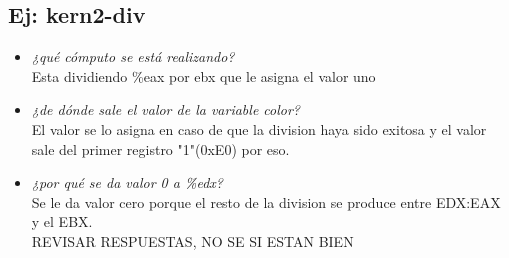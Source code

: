 \documentclass[a4paper, 12pt]{article}
\begin{document}
		\subsection{Ej: kern2-div}
		\begin{itemize}
			Explicar el funcionamiento exacto de la línea asm(\ldots) del
			punto anterior:\\
\begin{lstlisting}
	void kmain(const multiboot_info_t *mbi) {
	int8_t linea;
	uint8_t color;

	// ...

	idt_init();
	irq_init();

	asm("div %4"
	: "=a"(linea), "=c"(color)
	: "0"(18), "1"(0xE0), "b"(1), "d"(0));

	vga_write2("Funciona vga_write2?", linea, color);
	}

\end{lstlisting}
			\item \textit{¿qué cómputo se está realizando?\\}
			Esta dividiendo \%eax por ebx que le asigna el valor uno\\
			\item \textit{¿de dónde sale el valor de la variable color?\\}
			El valor se lo asigna en caso de que la division haya sido exitosa
			y el valor sale del primer registro "1"(0xE0) por eso.\\
			\item \textit{¿por qué se da valor 0 a \%edx?\\}
			Se le da valor cero porque el resto de la division se produce entre
			EDX:EAX y el EBX.\\
			REVISAR RESPUESTAS, NO SE SI ESTAN BIEN\\
		\end{itemize}
\end{document}
